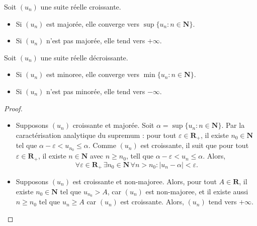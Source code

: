 \begin{theorem}
Soit $(u_{n})$ une suite réelle croissante.
\begin{itemize}
\item Si $(u_{n})$ est majorée, elle converge vers $\sup \{ u_{n}:n\in \mathbf{N} \}$.
\item Si $(u_{n})$ n'est pas majorée, elle tend vers $+\infty$.
\end{itemize}
Soit $(u_{n})$ une suite réelle décroissante.
\begin{itemize}
\item Si $(u_{n})$ est minoree, elle converge vers $\min \{ u_{n}:n\in \mathbf{N} \}$.
\item Si $(u_{n})$ n'est pas minorée, elle tend vers $-\infty$.
\end{itemize}
\end{theorem}
\begin{proof}
\begin{itemize}
\item Supposons $(u_{n})$ croissante et majorée. Soit $\alpha=\sup \{ u_{n}:n\in \mathbf{N} \}$. Par la caractérisation analytique du supremum : pour tout $\varepsilon \in \mathbf{R}_{+}$, il existe $n_{0}\in \mathbf{N}$ tel que $\alpha -\varepsilon<u_{n_{0}}\le \alpha$. Comme $(u_{n})$ est croissante, il suit que pour tout $\varepsilon \in \mathbf{R}_{+}$, il existe $n\in \mathbf{N}$ avec $n\ge n_{0}$, tell que $\alpha -\varepsilon<u_{n}\le \alpha$. Alors,
$$
\forall\varepsilon \in \mathbf{R}_{+}\,\exists n_{0}\in \mathbf{N}\,\forall n>n_{0}:|u_{n}-\alpha|<\varepsilon.
$$
\item Supposons $(u_{n})$ est croissante et non-majoree. Alors, pour tout $A\in \mathbf{R}$, il existe $n_{0}\in \mathbf{N}$ tel que $u_{n_{0}}>A$, car $(u_{n})$ est non-majoree, et il existe aussi $n\ge n_{0}$ tel que $u_{n}\ge A$ car $(u_{n})$ est croissante. Alors, $(u_{n})$ tend vers $+\infty$.
\end{itemize}
\end{proof}

